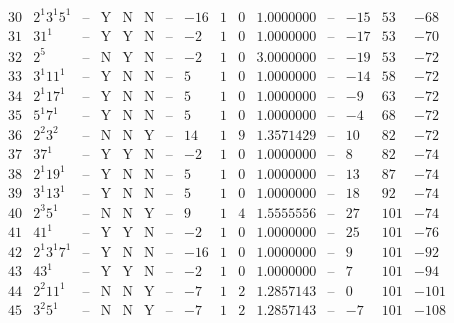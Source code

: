 \documentclass[11pt,reqno,a4letter]{article}
\numberwithin{figure}{section}
\numberwithin{table}{section}
\theoremstyle{plain}
\numberwithin{theorem}{section}
\theoremstyle{definition}
\begin{document}
\begin{table}[h!]
\begin{equation*}
{\begin{array}{|cc|c|ccc|c|c|ccc|c|ccc}
 30 & 2^1 3^1 5^1 & \text{--} & \text{Y} & \text{N} & \text{N} & \text{--} & -16 & 1 & 0 & 1.0000000 & \text{--} & -15 & 53 & -68 \\
 31 & 31^1 & \text{--} & \text{Y} & \text{Y} & \text{N} & \text{--} & -2 & 1 & 0 & 1.0000000 & \text{--} & -17 & 53 & -70 \\
 32 & 2^5 & \text{--} & \text{N} & \text{Y} & \text{N} & \text{--} & -2 & 1 & 0 & 3.0000000 & \text{--} & -19 & 53 & -72 \\
 33 & 3^1 11^1 & \text{--} & \text{Y} & \text{N} & \text{N} & \text{--} & 5 & 1 & 0 & 1.0000000 & \text{--} & -14 & 58 & -72 \\
 34 & 2^1 17^1 & \text{--} & \text{Y} & \text{N} & \text{N} & \text{--} & 5 & 1 & 0 & 1.0000000 & \text{--} & -9 & 63 & -72 \\
 35 & 5^1 7^1 & \text{--} & \text{Y} & \text{N} & \text{N} & \text{--} & 5 & 1 & 0 & 1.0000000 & \text{--} & -4 & 68 & -72 \\
 36 & 2^2 3^2 & \text{--} & \text{N} & \text{N} & \text{Y} & \text{--} & 14 & 1 & 9 & 1.3571429 & \text{--} & 10 & 82 & -72 \\
 37 & 37^1 & \text{--} & \text{Y} & \text{Y} & \text{N} & \text{--} & -2 & 1 & 0 & 1.0000000 & \text{--} & 8 & 82 & -74 \\
 38 & 2^1 19^1 & \text{--} & \text{Y} & \text{N} & \text{N} & \text{--} & 5 & 1 & 0 & 1.0000000 & \text{--} & 13 & 87 & -74 \\
 39 & 3^1 13^1 & \text{--} & \text{Y} & \text{N} & \text{N} & \text{--} & 5 & 1 & 0 & 1.0000000 & \text{--} & 18 & 92 & -74 \\
 40 & 2^3 5^1 & \text{--} & \text{N} & \text{N} & \text{Y} & \text{--} & 9 & 1 & 4 & 1.5555556 & \text{--} & 27 & 101 & -74 \\
 41 & 41^1 & \text{--} & \text{Y} & \text{Y} & \text{N} & \text{--} & -2 & 1 & 0 & 1.0000000 & \text{--} & 25 & 101 & -76 \\
 42 & 2^1 3^1 7^1 & \text{--} & \text{Y} & \text{N} & \text{N} & \text{--} & -16 & 1 & 0 & 1.0000000 & \text{--} & 9 & 101 & -92 \\
 43 & 43^1 & \text{--} & \text{Y} & \text{Y} & \text{N} & \text{--} & -2 & 1 & 0 & 1.0000000 & \text{--} & 7 & 101 & -94 \\
 44 & 2^2 11^1 & \text{--} & \text{N} & \text{N} & \text{Y} & \text{--} & -7 & 1 & 2 & 1.2857143 & \text{--} & 0 & 101 & -101 \\
 45 & 3^2 5^1 & \text{--} & \text{N} & \text{N} & \text{Y} & \text{--} & -7 & 1 & 2 & 1.2857143 & \text{--} & -7 & 101 & -108 \\

\end{array}}
\end{equation*}
\end{table}
\end{document}
